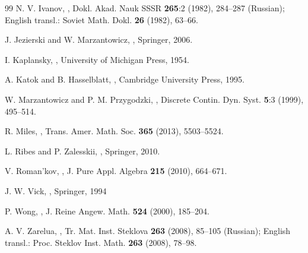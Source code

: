 \documentclass[12pt, a4paper]{amsart}
\begin{document}
\begin{thebibliography}{99}
{\sc N. V. Ivanov},
,
\newblock Dokl. Akad. Nauk SSSR {\bf 265}:2 (1982), 284--287 (Russian);
English transl.: Soviet Math. Dokl. {\bf 26} (1982), 63--66.

{\sc J. Jezierski and W. Marzantowicz},
,
\newblock Springer, 2006.

{\sc I. Kaplansky},
,
\newblock University of Michigan Press, 1954.

{\sc A. Katok and B. Hasselblatt},
,
\newblock Cambridge University Press, 1995.

{\sc W. Marzantowicz and P. M. Przygodzki},
,
\newblock Discrete Contin. Dyn. Syst. {\bf 5}:3 (1999), 495--514.

{\sc R. Miles},
,
\newblock Trans. Amer. Math. Soc. \textbf{365} (2013), 5503--5524.

{\sc L. Ribes and P. Zalesskii},
,
\newblock Springer, 2010.

{\sc V. Roman'kov},
,
\newblock J. Pure Appl. Algebra {\bf 215} (2010), 664--671.

{\sc J. W. Vick},
,
\newblock Springer, 1994

{\sc P. Wong},
,
\newblock J. Reine Angew. Math. {\bf 524} (2000), 185--204.

{\sc A. V. Zarelua},
,
\newblock Tr. Mat. Inst. Steklova {\bf 263} (2008), 85--105 (Russian);
English transl.: Proc. Steklov Inst. Math. {\bf 263} (2008), 78--98.



\end{thebibliography}
\end{document}
